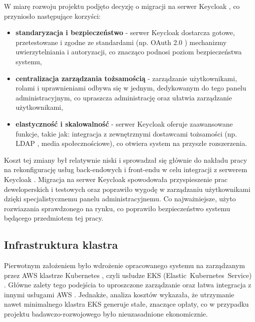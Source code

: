 W miarę rozwoju projektu podjęto decyzję o migracji na serwer Keycloak \cite{keycloak_docs}, co przyniosło następujące korzyści:
\begin{itemize}
    \item \textbf{standaryzacja i bezpieczeństwo} - serwer Keycloak \cite{keycloak_docs} dostarcza gotowe, przetestowane i zgodne ze standardami (np. OAuth 2.0 \cite{oauth2_rfc}) mechanizmy uwierzytelniania i autoryzacji, co znacząco podnosi poziom bezpieczeństwa systemu,
    \item \textbf{centralizacja zarządzania tożsamością} - zarządzanie użytkownikami, rolami i uprawnieniami odbywa się w jednym, dedykowanym do tego panelu administracyjnym, co upraszcza administrację oraz ułatwia zarządzanie użytkownikami,
    \item \textbf{elastyczność i skalowalność} - serwer Keycloak \cite{keycloak_docs} oferuje zaawansowane funkcje, takie jak: integracja z zewnętrznymi dostawcami tożsamości (np. LDAP \cite{ldap_rfc}, media społecznościowe), co otwiera system na przyszłe rozszerzenia.
\end{itemize}


Koszt tej zmiany był relatywnie niski i sprowadzał się głównie do nakładu pracy na rekonfigurację usług back-endowych i front-endu w celu integracji z serwerem Keycloak \cite{keycloak_docs}. Migracja na serwer Keycloak \cite{keycloak_docs} spowodowała przyspieszenie prac deweloperskich i testowych oraz poprawiło wygodę w zarządzaniu użytkownikami dzięki specjalistycznemu panelu administracyjnemu. Co najważniejsze, użyto rozwiazania sprawdzonego na rynku, co poprawiło bezpieczeństwo systemu będącego przedmiotem tej pracy.

\subsection{Infrastruktura klastra}

Pierwotnym założeniem było wdrożenie opracowanego systemu na zarządzanym przez AWS \cite{aws_docs} klastrze Kubernetes \cite{kubernetes}, czyli usłudze EKS (\mbox{Elastic Kubernetes Service}) \cite{eks_docs}. Główne zalety tego podejścia to uproszczone zarządzanie oraz łatwa integracja z innymi usługami AWS \cite{aws_docs}. Jednakże, analiza kosztów wykazała, że utrzymanie nawet minimalnego klastra EKS \cite{eks_docs} generuje stałe, znaczące opłaty, co w przypadku projektu badawczo-rozwojowego było nieuzasadnione ekonomicznie.

